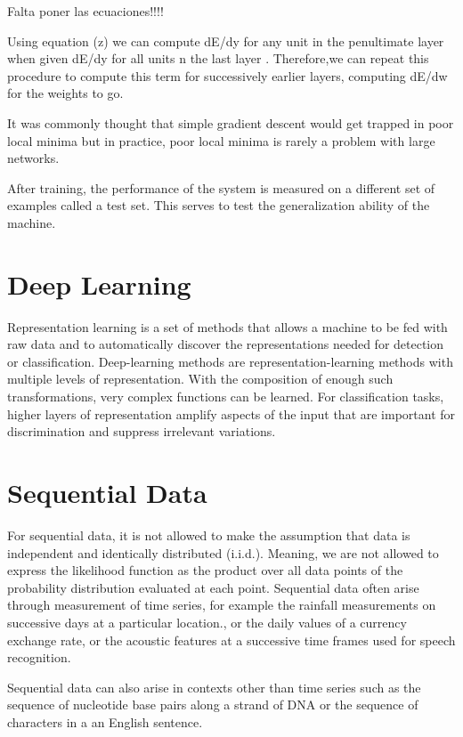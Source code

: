 Falta poner las ecuaciones!!!!



Using equation (z) we can compute dE/dy for any unit in the penultimate layer when given dE/dy for all units n the last layer \cite{polk2002cognitive}. Therefore,we can repeat this procedure to compute this term for successively earlier layers, computing dE/dw for the weights to go. 


It was commonly thought that simple gradient descent would get trapped in poor local minima but in practice, poor local minima is rarely a problem with large networks.\cite{lecun2015deep}


After training, the performance of the system is measured on a different set of examples called a test set. This serves to test the generalization ability of the machine\cite{lecun2015deep}.

\section{Deep Learning}

Representation learning is a set of methods that allows a machine to be fed with raw data and to automatically discover the representations needed for detection or classification. Deep-learning methods are representation-learning methods with multiple levels of representation. With the composition of enough such transformations, very complex functions can be learned. For classification tasks, higher layers of representation amplify aspects of the input that are important for discrimination and suppress irrelevant variations\cite{lecun2015deep}.

\section{Sequential Data}
For sequential data, it is not allowed to make the assumption that data is independent and identically distributed (i.i.d.). Meaning, we are not allowed to express the likelihood function as the product over all data points of the probability distribution evaluated at each point.
Sequential data often arise through measurement of time series, for example the rainfall measurements on successive days at a particular location., or the daily values of a currency exchange rate, or the acoustic features at a successive time frames used for speech recognition. 

Sequential data can also arise in contexts other than time series such as the sequence of nucleotide base pairs along a strand of DNA or the sequence of characters in a an English sentence.

